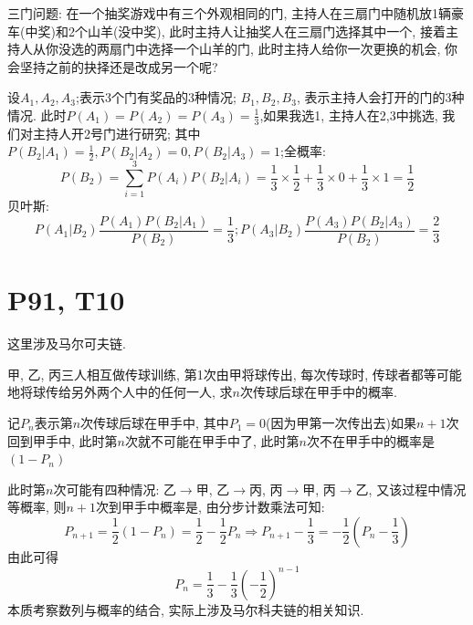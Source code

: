 \documentclass{book}
\begin{document}
    \textcolor[rgb]{0.38,0.11,0.2}{三门问题}: 在一个抽奖游戏中有三个外观相同的门, 主持人在三扇门中随机放1辆豪车(中奖)和2个山羊(没中奖), 此时主持人让抽奖人在三扇门选择其中一个, 接着主持人从你没选的两扇门中选择一个山羊的门, 此时主持人给你一次更换的机会, 你会坚持之前的抉择还是改成另一个呢?

    设$A_1,A_2,A_3$;表示3个门有奖品的3种情况; $B_1,B_2,B_3$, 表示主持人会打开的门的3种情况. 此时$\displaystyle P(A_1)=P(A_2)=P(A_3)=\frac{1}{3}$,如果我选1, 主持人在2,3中挑选, 我们对主持人开2号门进行研究; 其中$\displaystyle P\left( B_2\Big|A_1 \right)=\frac{1}{2},P\left( B_2\Big|A_2 \right)=0,P\left( B_2\Big|A_3 \right)=1$;全概率: $$P\left( B_2 \right)=\sum_{i=1}^{3} P(A_i)P\left ( B_2\Big |A_i \right ) =\frac{1}{3}\times \frac{1}{2} +\frac{1}{3}\times 0+\frac{1}{3}\times 1=\frac{1}{2} $$贝叶斯:$$P\left( A_1\Big|B_2 \right)\frac{P(A_1)P\left( B_2\Big|A_1 \right)}{P(B_2)}=\frac{1}{3};P\left( A_3\Big|B_2 \right)\frac{P(A_3)P\left( B_2\Big|A_3 \right)}{P(B_2)}=\frac{2}{3}$$
    \section{\textcolor[rgb]{0.11,0.65,0.52}{P91, T10}}
    这里涉及\textcolor[rgb]{0.38,0.11,0.2}{马尔可夫链}.

    \begin{boxB}
        甲, 乙, 丙三人相互做传球训练, 第1次由甲将球传出, 每次传球时, 传球者都等可能地将球传给另外两个人中的任何一人, 求$n$次传球后球在甲手中的概率.
    \end{boxB}

    记$P_n$表示第$n$次传球后球在甲手中, 其中$P_1=0$(因为甲第一次传出去)如果$n+1$次回到甲手中, 此时第$n$次就不可能在甲手中了, 此时\textcolor[rgb]{0.75,0.17,0.22}{第$n$次不在甲手中的概率是$(1-P_n)$}

    此时第$n$次可能有四种情况: 乙$\rightarrow$甲, 乙$\rightarrow$丙, 丙$\rightarrow$甲, 丙$\rightarrow$乙, 又该过程中情况等概率, 则$n+1$次到甲手中概率是, 由分步计数乘法可知:$$P_{n+1}=\frac{1}{2}\left( 1-P_n \right)=\frac{1}{2}-\frac{1}{2}P_n\Longrightarrow P_{n+1}-\frac{1}{3}=-\frac{1}{2}\left( P_n-\frac{1}{3} \right)$$由此可得$$P_n=\frac{1}{3}-\frac{1}{3}\left( -\frac{1}{2} \right)^{n-1}$$
本质考察数列与概率的结合, 实际上涉及\textcolor[rgb]{0.38,0.11,0.2}{马尔科夫链}的相关知识.
\end{document}

